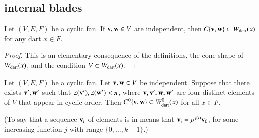 \subsection{internal blades}


\begin{lemma}  Let $(V,E,F)$ be a cyclic fan.   If ${\mathbf v},{\mathbf w}\in V$ are independent, then $C\{{\mathbf v},{\mathbf w}\} \subset W_{\text{dart}}(x)$ for any dart $x\in F$.
\end{lemma}
%

\begin{proof}  This is an elementary consequence of the definitions, the cone shape of $W_{\text{dart}}(x)$,  and the condition $V\subset W_{\text{dart}}(x)$.
\end{proof}


\begin{lemma}  \label{lemma:internal}
Let $(V,E,F)$ be a cyclic fan. 
Let ${\mathbf v},{\mathbf w}\in V$ be independent.  Suppose that there exists ${\mathbf v}',{\mathbf w}'$ such
that $\angle({\mathbf v}'),\angle({\mathbf w}')<\pi$, where ${\mathbf v},{\mathbf v}',{\mathbf w},{\mathbf w}'$ are four distinct elements of
$V$ that appear in cyclic order.
Then $C^0\{{\mathbf v},{\mathbf w}\}\subset W^0_{\text{dart}}(x)$ for all $x\in F$.
\end{lemma}
%
%
%

(To say that a sequence ${\mathbf v}_i$ of elements is in  means that
${\mathbf v}_i = \rho^{j (i)}{\mathbf v}_0$, for some increasing function $j$ with range $\{0,\ldots,k-1\}$.)

